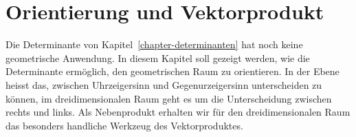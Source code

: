 %
%
%
\chapter{Orientierung und Vektorprodukt\label{chapter:orientierung}}
\rhead{}
Die Determinante von Kapitel~\ref{chapter-determinanten} hat noch
keine geometrische Anwendung.
In diesem Kapitel soll gezeigt werden, wie die Determinante ermöglich,
den geometrischen Raum zu orientieren.
In der Ebene heisst das, zwischen Uhrzeigersinn und Gegenurzeigersinn
unterscheiden zu können, im dreidimensionalen Raum geht es um die
Unterscheidung zwischen rechts und links.
Als Nebenprodukt erhalten wir für den dreidimensionalen Raum das
besonders handliche Werkzeug des Vektorproduktes.






